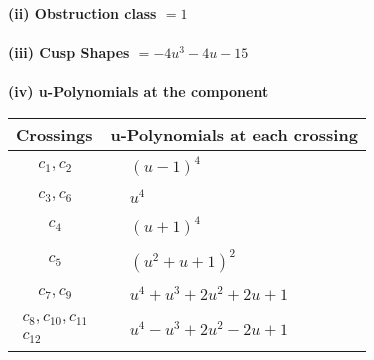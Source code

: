 \documentclass[1p]{elsarticle_modified}
\theoremstyle{definition}
\begin{document}
\flushleft \textbf{(ii) Obstruction class $= 1$}\\~\\
\flushleft \textbf{(iii) Cusp Shapes $= -4 u^3-4 u-15$}\\~\\
\newpage\renewcommand{\arraystretch}{1}
\flushleft \textbf{(iv) u-Polynomials at the component}\newline \\
\begin{tabular}{m{50pt}|m{274pt}}
Crossings & \hspace{64pt}u-Polynomials at each crossing \\
\hline $$\begin{aligned}c_{1},c_{2}\end{aligned}$$&$\begin{aligned}
&(u-1)^4
\end{aligned}$\\
\hline $$\begin{aligned}c_{3},c_{6}\end{aligned}$$&$\begin{aligned}
&u^4
\end{aligned}$\\
\hline $$\begin{aligned}c_{4}\end{aligned}$$&$\begin{aligned}
&(u+1)^4
\end{aligned}$\\
\hline $$\begin{aligned}c_{5}\end{aligned}$$&$\begin{aligned}
&(u^2+u+1)^2
\end{aligned}$\\
\hline $$\begin{aligned}c_{7},c_{9}\end{aligned}$$&$\begin{aligned}
&u^4+u^3+2 u^2+2 u+1
\end{aligned}$\\
\hline $$\begin{aligned}c_{8},c_{10},c_{11}\\c_{12}\end{aligned}$$&$\begin{aligned}
&u^4- u^3+2 u^2-2 u+1
\end{aligned}$\\
\hline
\end{tabular}\\~\\
\end{document}
